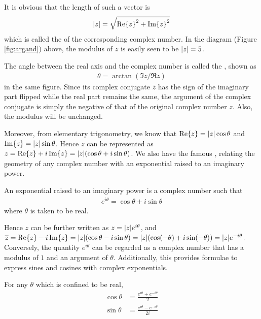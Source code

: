 It is obvious that the length of such a vector is 
\begin{align}
\abs{z} = \sqrt{\Re{z}^2 + \Im{z}^2} \label{eqn:modulus}
\end{align}
which is called the  of the corresponding complex number. In the diagram (Figure \ref{fig:argand}) above, the modulus of $z$ is easily seen to be $\abs{z} = 5$. \par
The angle between the real axis and the complex number is called the , shown as
\begin{align}
\theta = \arctan(\Im{z}/\Re{z}) \label{eqn:argument} 
\end{align}
in the same figure. Since its complex conjugate $\overline{z}$ has the sign of the imaginary part flipped while the real part remains the same, the argument of the complex conjugate is simply the negative of that of the original complex number $z$. Also, the modulus will be unchanged. \par
Moreover, from elementary trigonometry, we know that $\Re{z} = \abs{z} \cos{\theta}$ and $\Im{z} = \abs{z} \sin{\theta}$. Hence $z$ can be represented as $z = \Re{z} + i\Im{z} = \abs{z} (\cos \theta + i \sin \theta)$. We also have the famous , relating the geometry of any complex number with an exponential raised to an imaginary power.
\begin{defn}
\label{defn:Euler}
An exponential raised to an imaginary power is a complex number such that
\begin{align}
e^{i \theta} = \cos \theta + i \sin \theta \label{eqn:Euler}
\end{align}
where $\theta$ is taken to be real.
\end{defn}
Hence $z$ can be further written as $z = \abs{z} e^{i \theta}$, and $\overline{z} = \Re{z} - i\Im{z} = \abs{z} (\cos \theta - i \sin \theta) = \abs{z} (\cos (-\theta) + i \sin (-\theta)) = \abs{z} e^{-i \theta}$. Conversely, the quantity $e^{i \theta}$ can be regarded as a complex number that has a modulus of $1$ and an argument of $\theta$. Additionally, this provides formulae to express sines and cosines with complex exponentials.
\begin{proper}
\label{proper:sincoscomplex}
For any $\theta$ which is confined to be real,
\begin{subequations}
\label{eqn:sincoscomplex}
\begin{align}
\cos \theta &= \frac{e^{i\theta} + e^{-i\theta}}{2} \label{eqn:sincoscomplexa}\\
\sin \theta &= \frac{e^{i\theta} - e^{-i\theta}}{2i}
\end{align}
\end{subequations}
\end{proper}
